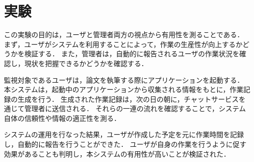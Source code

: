 \section{実験}

この実験の目的は，ユーザと管理者両方の視点から有用性を測ることである．
まず，ユーザがシステムを利用することによって，作業の生産性が向上するかどうかを検証する．
また，管理者は，自動的に報告されるユーザの作業状況を確認し，現状を把握できるかどうかを確認する．

監視対象であるユーザは，論文を執筆する際にアプリケーションを起動する．
本システムは，起動中のアプリケーションから収集される情報をもとに，作業記録の生成を行う．
生成された作業記録は，次の日の朝に，チャットサービスを通じて管理者に送信される．
それらの一連の流れを確認することで，システム自体の信頼性や情報の適正性を測る．

システムの運用を行なった結果，ユーザが作成した予定を元に作業時間を記録し，自動的に報告を行うことができた．
ユーザが自身の作業を行うように促す効果があることも判明し，本システムの有用性が高いことが検証された．
